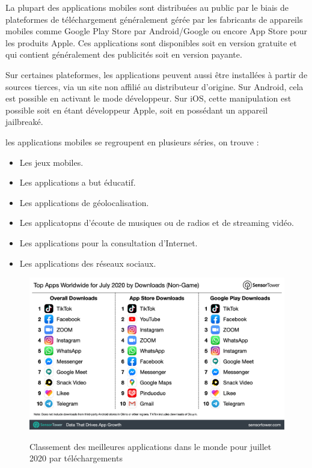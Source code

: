 La plupart des applications mobiles sont distribuées au public par le biais de plateformes de téléchargement généralement gérée par les fabricants de appareils mobiles comme Google Play Store par Android/Google ou encore App Store pour les produits Apple. Ces applications sont disponibles soit en version gratuite et qui contient généralement des publicités soit en version payante.

Sur certaines plateformes, les applications peuvent aussi être installées à partir de sources tierces, via un site non affilié au distributeur d'origine. Sur Android, cela est possible en activant le mode développeur. Sur iOS, cette manipulation est possible soit en étant développeur Apple, soit en possédant un appareil jailbreaké.~\cite{ApplicationMobile2020}

les applications mobiles se regroupent en plusieurs séries, on trouve : 
\begin{itemize}
   \item Les jeux mobiles.
   \item Les applications a but éducatif.
   \item Les applications de géolocalisation.
   \item Les applicatopns d'écoute de musiques ou de radios et de streaming vidéo.
   \item Les applications pour la consultation d'Internet.
   \item Les applications des réseaux sociaux.
\end{itemize}

\begin{figure}[!ht]
    \centering
    \includegraphics[width=4.6in]{images/Chapitre1/app_downloads.jpg}
    \label{fig:ios Ui}
    \caption{Classement des meilleures applications dans le monde pour juillet 2020 par téléchargements}
\end{figure}
\newpage
